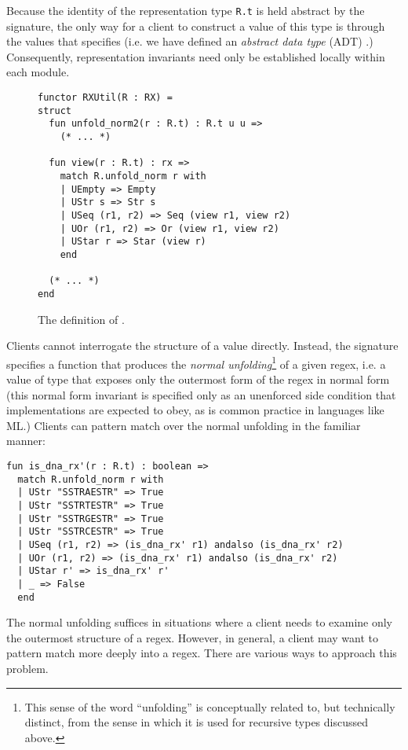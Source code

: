 Because the identity of the representation type \lstinline{R.t} is held abstract by the signature, the only way for a client to construct a value of this type is through the values that  specifies (i.e. we have defined an \emph{abstract data type} (ADT) \cite{liskov1974programming}.) Consequently, representation invariants need only be established locally within each module.



\begin{figure}
\begin{lstlisting}[numbers=none]
functor RXUtil(R : RX) = 
struct
  fun unfold_norm2(r : R.t) : R.t u u => 
    (* ... *)

  fun view(r : R.t) : rx => 
    match R.unfold_norm r with 
    | UEmpty => Empty
    | UStr s => Str s
    | USeq (r1, r2) => Seq (view r1, view r2)
    | UOr (r1, r2) => Or (view r1, view r2)
    | UStar r => Star (view r)
    end 

  (* ... *)
end
\end{lstlisting}
\caption{The definition of .}
\label{fig:RXUtil}
\end{figure}

Clients cannot interrogate the structure of a value  directly. Instead, the signature specifies a function  that produces the \emph{normal unfolding}\footnote{This sense of the word ``unfolding'' is conceptually related to, but technically distinct, from the sense in which it is used for recursive types discussed above.} of a given regex, i.e. a value of type  that exposes only the outermost form of the regex in normal form (this normal form invariant is specified only as an unenforced side condition that implementations are expected to obey, as is common practice in languages like ML.) Clients can pattern match over the {normal unfolding} in the familiar manner:
\begin{lstlisting}[numbers=none]
fun is_dna_rx'(r : R.t) : boolean => 
  match R.unfold_norm r with 
  | UStr "SSTRAESTR" => True
  | UStr "SSTRTESTR" => True
  | UStr "SSTRGESTR" => True
  | UStr "SSTRCESTR" => True
  | USeq (r1, r2) => (is_dna_rx' r1) andalso (is_dna_rx' r2)
  | UOr (r1, r2) => (is_dna_rx' r1) andalso (is_dna_rx' r2)
  | UStar r' => is_dna_rx' r'
  | _ => False
  end
\end{lstlisting}

The normal unfolding suffices in situations where a client needs to examine only the outermost structure of a regex. However, in general, a client may want to pattern match more deeply into a regex. There are various ways to approach this problem. 

